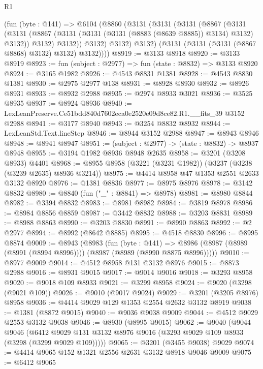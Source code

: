 \begin{lexlean}{R1}
\begin{coremodule}
      (fun (byte : @141) =>
      @6104
        (@8860
          (@3131
            (@3131
              (@3131
                (@8867
                  (@3131
                    (@3131
                      (@8867 (@3131 (@3131 (@3131 (@8883 (@8639 @8885)) @3134) @3132) @3132))
                      @3132)
                    @3132))
                @3132)
              @3132)
            @3132)
          (@3131 (@3131 (@3131 (@8867 @8868) @3132) @3132) @3132))))
@8919 := @3133 @8918
@8920 := @3133 @8919
@8923 := fun (subject : @2977) => fun (state : @8832) => @3133 @8920
@8924 := @3165 @1982
@8926 := @4543 @8831 @1381
@8928 := @4543 @8830 @1381
@8930 := @2975 @2977 @138
@8931 := @8928 @8930
@8932 := @8926 @8931
@8933 := @8932 @2988
@8935 := @2974 @8933 @3021
@8936 := @3525 @8935
@8937 := @8924 @8936
@8940 := LexLeanPreserve.Ce51bdd840d7602eca0e2520e09d8ce82.R1.__fits_39 @3152 @2988
@8941 := @3177 @8940
@8943 := @3254 @8832 @8932
@8944 := LexLeanStd.Text.lineStep
@8946 := @8944 @3152 @2988
@8947 := @8943 @8946
@8948 := @8941 @8947
@8951 := (subject : @2977) -> (state : @8832) -> @8937 @8948
@8955 := @3194 @1982 @8936 @8948 @2635
@8958 := @3201 (@3208 @8933) @4401
@8968 := @8955 @8958 (@3221 (@3231 @1982)) (@3237 (@3238 (@3239 @2635) @8936 @3214))
@8975 := @4414 @8958 @47 @1353 @2551 @2633 @3132 @8920
@8976 := @1381 @8836
@8977 := @8975 @8976
@8978 := @3142 @8832
@8980 := @8840 (fun ("_" : @8841) => @8978)
@8981 := @8980 @8844
@8982 := @3394 @8832
@8983 := @8981 @8982
@8984 := @3819 @8978
@8986 := @8984 @8856 @8859
@8987 := @3442 @8832
@8988 := @3203 @8831
@8989 := @8988 @8863
@8990 := @3203 @8830
@8991 := @8990 @8863
@8992 := @2 @2977
@8994 := @8992 (@8642 @8885)
@8995 := @4518 @8830
@8996 := @8995 @8874
@9009 := @8943
    (@8983
      (fun (byte : @141) =>
      @8986 (@8987 (@8989 (@8991 (@8994 @8996)))) (@8987 (@8989 (@8990 @8875 @8996)))))
@9010 := @8977 @9009
@9014 := @4512 @8958 @131 @3132 @8976
@9015 := @8873 @2988
@9016 := @8931 @9015
@9017 := @9014 @9016
@9018 := @3293 @8958
@9020 := @9018 @109 @8933
@9021 := @3299 @8958
@9024 := @9020 (@3298 (@9021 @109))
@9026 := @9010 (@9017 @9024)
@9029 := @3201 (@3205 @8976) @8958
@9036 := @4414 @9029 @129 @1353 @2554 @2632 @3132 @8919
@9038 := @1381 (@8872 @9015)
@9040 := @9036 @9038 @9009
@9044 := @4512 @9029 @2553 @3132 @9038
@9046 := @8930 (@8995 @9015)
@9062 := @9040
    (@9044
      @9046
      (@6412 @9029 @131 @3132 @8976 @9016 (@3293 @9029 @109 @8933 (@3298 (@3299 @9029 @109)))))
@9065 := @3201 (@3455 @9038) @9029
@9074 := @4414 @9065 @152 @1321 @2556 @2631 @3132 @8918 @9046 @9009
@9075 := @6412 @9065

\end{coremodule}
\end{lexlean}
